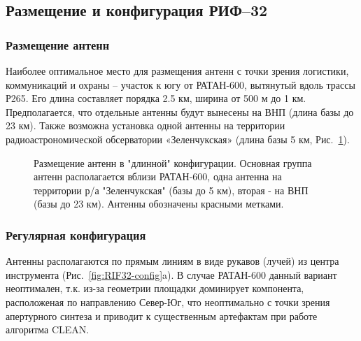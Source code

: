 \documentclass[10pt,a4paper]{article}
\begin{document}
\subsection{Размещение и конфигурация РИФ--32}

\subsubsection{Размещение антенн}

Наиболее оптимальное место для размещения антенн с точки зрения логистики, коммуникаций и охраны – участок к югу от РАТАН-600, вытянутый вдоль трассы Р265. Его длина составляет порядка 2.5 км, ширина от 500 м до 1 км.
Предполагается, что отдельные антенны будут вынесены на ВНП (длина базы до 23 км).
Также возможна установка одной антенны на территории радиоастрономической обсерватории «Зеленчукская» (длина базы 5 км, Рис.~\ref{fig:RIF32-location}).

\begin{figure}
\caption{Размещение антенн в "длинной" конфигурации. Основная группа антенн располагается вблизи РАТАН-600, одна антенна на территории р/а "Зеленчукская" (базы до 5 км), вторая - на ВНП (базы до 23 км). Антенны обозначены красными метками.}
\label{fig:RIF32-location}
\end{figure}

\subsubsection{Регулярная конфигурация}
Антенны располагаются по прямым линиям в виде рукавов (лучей) из центра инструмента (Рис.~\ref{fig:RIF32-config}a). В случае РАТАН-600 данный вариант неоптимален, т.к. из-за геометрии площадки доминирует компонента, расположеная по направлению Север-Юг, что неоптимально с точки зрения апертурного синтеза и приводит к существенным артефактам при работе алгоритма CLEAN.
\end{document}
